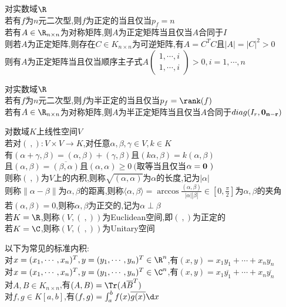\begin{dingli}
对实数域$\R$\\
若有$f$为$n$元二次型,则$f$为正定的当且仅当$p_{f}=n$\\
若有$A\in\R_{n\times n}$为对称矩阵,则$A$为正定矩阵当且仅当$A$合同于$I$\\
则若$A$为正定矩阵,则存在$C\in K_{n\times n}$为可逆矩阵,有$A=C^{T}C$且$|A|=|C|^2>0$\\
则有$A$为正定矩阵当且仅当顺序主子式$A\begin{pmatrix}1,\cdots,i\\ 1,\cdots,i\end{pmatrix}>0,i=1,\cdots,n$
\end{dingli}

\begin{dingli}
对实数域$\R$\\
若有$f$为$n$元二次型,则$f$为半正定的当且仅当$p_{f}=\rank(f)$\\
若有$A\in\R_{n\times n}$为对称矩阵,则$A$为半正定矩阵当且仅当$A$合同于$diag(I_r,{\bf0_{n-r}})$
\end{dingli}

\begin{dingyi}
对数域$K$上线性空间$V$\\
若对$(\ ,):V\times V\to K$,对任意$\alpha,\beta,\gamma\in V,k\in K$\\
有$(\alpha+\gamma,\beta)=(\alpha,\beta)+(\gamma,\beta)$且$(k\alpha,\beta)=k(\alpha,\beta)$\\
且$(\alpha,\beta)=\overline{(\beta,\alpha)}$且$(\alpha,\alpha)\geq 0\ ($取等当且仅当$\alpha={\bf0}\ )$\\
则称$(\ ,)$为$V$上的内积,则称$\sqrt{(\alpha,\alpha)}$为$\alpha$的长度,记为$|\alpha|$\\
则称$\|\alpha-\beta\|$为$\alpha,\beta$的距离,则称$\langle\alpha,\beta\rangle=\arccos\frac{(\alpha,\beta)}{|\alpha||\beta|}\in [0,\frac{\pi}{2}]$为$\alpha,\beta$的夹角\\
若$(\alpha,\beta)=0$,则称$\alpha,\beta$为正交的,记为$\alpha\perp\beta$\\
若$K=\R$,则称$(V,(\ ,))$为Euclidean空间,即$(\ ,)$为正定的\\
若$K=\C$,则称$(V,(\ ,))$为Unitary空间
\end{dingyi}

\begin{zhu}
以下为常见的标准内积:\\
对$x=(x_1,\cdots,x_n)^{T},y=(y_1,\cdots,y_n)^{T}\in\R^n$,有$(x,y)=x_1y_1+\cdots+x_ny_n$\\
对$x=(x_1,\cdots,x_n)^{T},y=(y_1,\cdots,y_n)^{T}\in\C^n$,有$(x,y)=x_1\overline{y_1}+\cdots+x_n\overline{y_n}$\\
对$A,B\in K_{n\times n}$,有$(A,B)=\Tr(A\overline{B}^{T})$\\
对$f,g\in K[a,b]$,有$(f,g)=\int_{a}^{b}f(x)\overline{g(x)}\d x$
\end{zhu}

